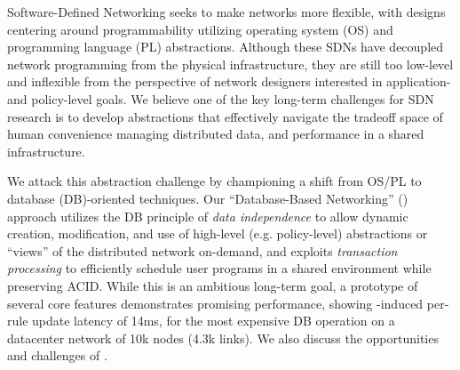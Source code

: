 Software-Defined Networking seeks to make networks more flexible, with
designs centering around programmability utilizing operating system
(OS) and programming language (PL) abstractions.  Although these SDNs
have decoupled network programming from the physical infrastructure,
they are still too low-level and inflexible from the perspective of
network designers interested in application- and policy-level goals.
We believe one of the key long-term challenges for SDN research is to
develop abstractions that effectively navigate the tradeoff space of
human convenience managing distributed data, and performance in a
shared infrastructure.

We attack this abstraction challenge by championing a shift from OS/PL
to database (DB)-oriented techniques. Our ``Database-Based
Networking'' (\Sys) approach utilizes the DB principle of \emph{data
independence} to allow dynamic creation, modification, and use of
high-level (e.g. policy-level) abstractions or ``views'' of the
distributed network on-demand, and exploits \emph{transaction
processing} to efficiently schedule user programs in a shared
environment while preserving ACID. While this is an ambitious
long-term goal, a prototype of several core features demonstrates
promising performance, showing \Sys-induced per-rule update latency of
14ms, for the most expensive DB operation on a datacenter network of
10k nodes (4.3k links). We also discuss the opportunities and
challenges of \Sys.


